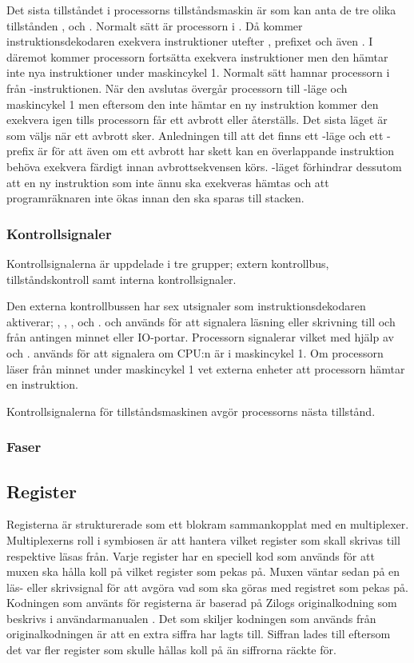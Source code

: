 \documentclass[main.tex]{subfiles}
\begin{document}
Det sista tillståndet i processorns tillståndsmaskin är  som kan
anta de tre olika tillstånden ,  och .
Normalt sätt är processorn i . Då kommer instruktionsdekodaren
exekvera instruktioner utefter , prefixet och även . I
 däremot kommer processorn fortsätta exekvera instruktioner men den
hämtar inte nya instruktioner under maskincykel 1. Normalt sätt hamnar
processorn i  från -instruktionen. När den avslutas
övergår processorn till -läge och maskincykel 1 men eftersom den
inte hämtar en ny instruktion kommer den exekvera  igen tills
processorn får ett avbrott eller återställs. Det sista läget är
 som väljs när ett avbrott sker. Anledningen till att det finns
ett -läge och ett -prefix är för att även om ett
avbrott har skett kan en överlappande instruktion behöva exekvera färdigt innan
avbrottsekvensen körs. -läget förhindrar dessutom att en ny
instruktion som inte ännu ska exekveras hämtas och att programräknaren inte
ökas innan den ska sparas till stacken.

\subsubsection{Kontrollsignaler}
Kontrollsignalerna är uppdelade i tre grupper; extern kontrollbus,
tillståndskontroll samt interna kontrollsignaler.

Den externa kontrollbussen har sex utsignaler som instruktionsdekodaren
aktiverar; , , ,  och .
 och  används för att signalera läsning eller skrivning till
och från antingen minnet eller IO-portar. Processorn signalerar vilket med
hjälp av  och .  används för att signalera om
CPU:n är i maskincykel 1. Om processorn läser från minnet under maskincykel 1
vet externa enheter att processorn hämtar en instruktion.

Kontrollsignalerna för tillståndsmaskinen avgör processorns nästa tillstånd.

\subsubsection{Faser}

\subsection{Register}
Registerna är strukturerade som ett blokram sammankopplat med en multiplexer.
Multiplexerns roll i symbiosen är att hantera vilket register som skall skrivas
till respektive läsas från. Varje register har en speciell kod som används för
att muxen ska hålla koll på vilket register som pekas på. Muxen väntar sedan på
en läs- eller skrivsignal för att avgöra vad som ska göras med registret som
pekas på. Kodningen som använts för registerna är baserad på Zilogs
originalkodning som beskrivs i användarmanualen \cite{userman}. Det som skiljer
kodningen som används från originalkodningen är att en extra siffra har lagts
till. Siffran lades till eftersom det var fler register som skulle hållas koll
på än siffrorna räckte för.
\end{document}
